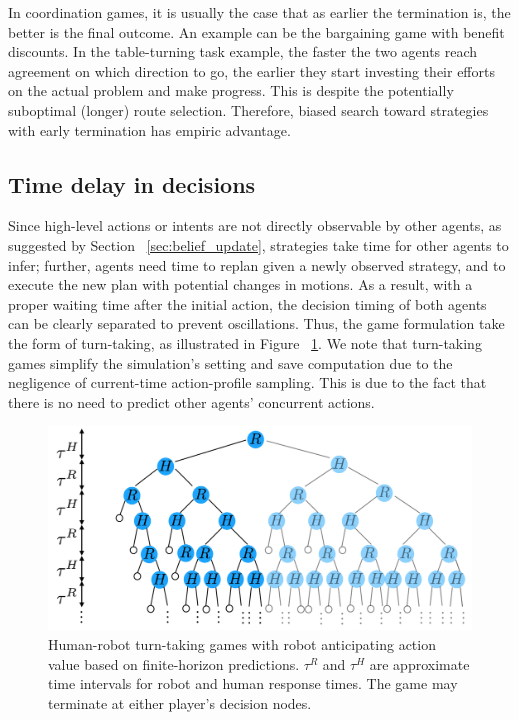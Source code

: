 \documentclass[letterpaper, 10 pt, conference]{ieeeconf}  %
\begin{document}
In coordination games, it is usually the case that as earlier the termination is, the better is the final outcome. An example can be the bargaining game with benefit discounts. 
In the table-turning task example, the faster the two agents reach 
agreement on which direction to go, the earlier they start investing their efforts on the actual problem and make progress. This is despite the 
potentially suboptimal (longer) route selection. Therefore, biased search toward strategies with early termination has empiric advantage.

\subsection{Time delay in decisions}
Since high-level actions or intents are not directly observable by other 
agents, as suggested by Section 
~\ref{sec:belief_update}, strategies take time 
for other agents to infer; further, agents need time to replan given a newly observed strategy, and to execute the new plan with potential changes in motions. As a result, with a proper waiting time after the initial action, the decision timing of both agents can be clearly separated to prevent oscillations. Thus, the game formulation take the form of turn-taking, as illustrated in Figure ~\ref{fig:turn_taking}. 
We note that turn-taking games simplify the simulation's setting and save computation due to the negligence of current-time action-profile sampling. This is due to the fact that there is no need to predict other agents' concurrent actions. 
\begin{figure}[t]
      \centering
      \vspace{-1em}
      \includegraphics[scale=0.2]{turn_taking}
      \vspace{-1.4em}
      \caption{
        Human-robot turn-taking games with robot anticipating action value based on finite-horizon predictions. $\tau^R$ and $\tau^H$ are approximate time intervals for robot and human response times. The game may terminate at either player's decision nodes.}
      \vspace{-1.7em}
     \label{fig:turn_taking}
\end{figure}
\end{document}

